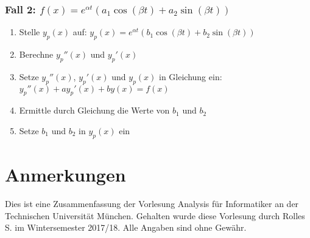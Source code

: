 \documentclass[a4paper,9pt]{extarticle}
\begin{document}
	\subsubsection*{Fall 2: $f(x) = e^{\alpha t}(a_1 \cos (\beta t) + a_2 \sin (\beta t))$}
	\begin{enumerate}
		\item Stelle $y_p(x)$ auf: $y_p(x) = e^{\alpha t} (b_1 \cos (\beta t) + b_2 \sin (\beta t))$
		\item Berechne $y_p''(x)$ und $y_p'(x)$
		\item Setze $y_p''(x)$, $y_p'(x)$ und $y_p(x)$ in Gleichung ein: \\
		$y_p''(x) + ay_p'(x) + by(x) = f(x)$
		\item Ermittle durch Gleichung die Werte von $b_1$ und $b_2$
		\item Setze $b_1$ und $b_2$ in $y_p(x)$ ein
	\end{enumerate}

\pagebreak
\section*{Anmerkungen}
Dies ist eine Zusammenfassung der Vorlesung Analysis für Informatiker an der Technischen Universität München.
Gehalten wurde diese Vorlesung durch Rolles S. im Wintersemester 2017/18.
Alle Angaben sind ohne Gewähr.
	
\end{document}
